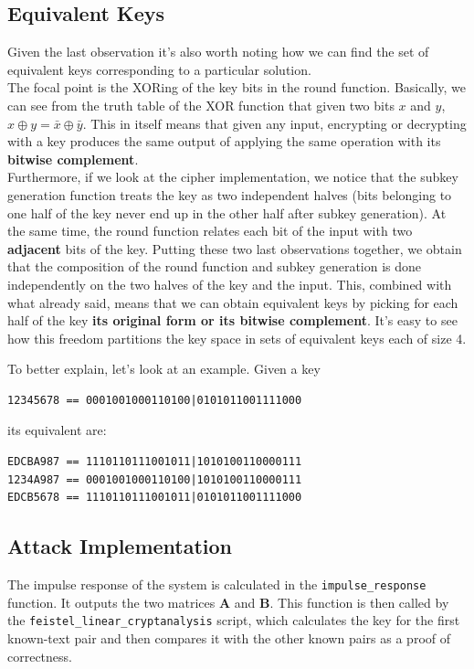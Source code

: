 \documentclass[a4paper,12pt,titlepage]{article}
\begin{document}
\subsection*{Equivalent Keys}
Given the last observation it's also worth noting how we can find the set of
equivalent keys corresponding to a particular solution. \\
The focal point is the XORing of the key bits in the round function. Basically,
we can see from the truth table of the XOR function that given two bits $x$
and $y$, $x \oplus y = \bar{x} \oplus \bar{y}$. This in itself means that given
any input, encrypting or decrypting with a key produces the same output of
applying the same operation with its \textbf{bitwise complement}. \\
Furthermore, if we look at the cipher implementation, we notice that the subkey generation
function treats the key as two independent halves (bits belonging to one half
of the key never end up in the other half after subkey generation). At the same
time, the round function relates each bit of the input with two
\textbf{adjacent} bits of the key. Putting these two last observations
together, we obtain that the composition of the round function and subkey
generation is done independently on the two halves of the key and the input.
This, combined with what already said, means that we can obtain equivalent keys
by picking for each half of the key \textbf{its original form or its bitwise
complement}. It's easy to see how this freedom partitions the key space in sets of
equivalent keys each of size 4.

To better explain, let's look at an example. Given a key
\begin{verbatim}
12345678 == 0001001000110100|0101011001111000
\end{verbatim}
its equivalent are:
\begin{verbatim}
EDCBA987 == 1110110111001011|1010100110000111
1234A987 == 0001001000110100|1010100110000111
EDCB5678 == 1110110111001011|0101011001111000
\end{verbatim}

\subsection*{Attack Implementation}
The impulse response of the system is calculated in the \texttt{impulse\_response}
function. It outputs the two matrices $\mathbf{A}$ and
$\mathbf{B}$. This function is then called by the
\texttt{feistel\_linear\_cryptanalysis} script, which calculates the key for the first
known-text pair and then compares it with the other known pairs as a proof of
correctness.
\end{document}
